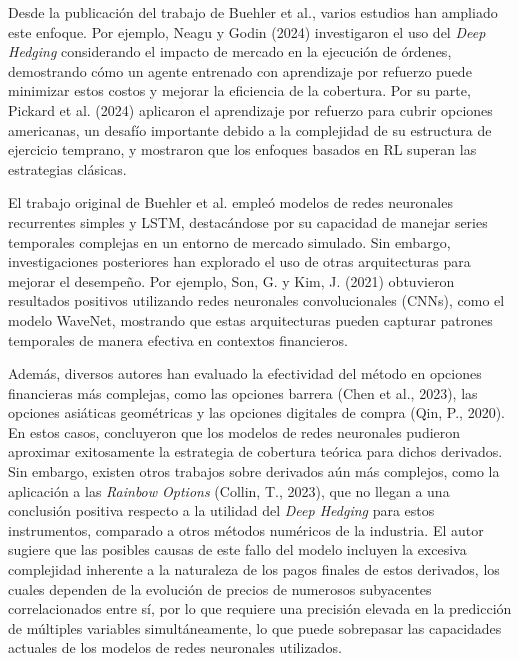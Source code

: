 \documentclass[11pt,a4paper,spanish]{article}
\numberwithin{equation}{section} %
\begin{document}
Desde la publicación del trabajo de Buehler et al., varios estudios han ampliado este enfoque. Por ejemplo, Neagu y Godin (2024) investigaron el uso del \textit{Deep Hedging} considerando el impacto de mercado en la ejecución de órdenes, demostrando cómo un agente entrenado con aprendizaje por refuerzo puede minimizar estos costos y mejorar la eficiencia de la cobertura. Por su parte, Pickard et al. (2024) aplicaron el aprendizaje por refuerzo para cubrir opciones americanas, un desafío importante debido a la complejidad de su estructura de ejercicio temprano, y mostraron que los enfoques basados en RL superan las estrategias clásicas.

El trabajo original de Buehler et al. empleó modelos de redes neuronales recurrentes simples y LSTM, destacándose por su capacidad de manejar series temporales complejas en un entorno de mercado simulado. Sin embargo, investigaciones posteriores han explorado el uso de otras arquitecturas para mejorar el desempeño. Por ejemplo, Son, G. y Kim, J. (2021) obtuvieron resultados positivos utilizando redes neuronales convolucionales (CNNs), como el modelo WaveNet, mostrando que estas arquitecturas pueden capturar patrones temporales de manera efectiva en contextos financieros.

Además, diversos autores han evaluado la efectividad del método en opciones financieras más complejas, como las opciones barrera (Chen et al., 2023), las opciones asiáticas geométricas y las opciones digitales de compra (Qin, P., 2020). En estos casos, concluyeron que los modelos de redes neuronales pudieron aproximar exitosamente la estrategia de cobertura teórica para dichos derivados. Sin embargo, existen otros trabajos sobre derivados aún más complejos, como la aplicación a las \textit{Rainbow Options} (Collin, T., 2023), que no llegan a una conclusión positiva respecto a la utilidad del \textit{Deep Hedging} para estos instrumentos, comparado a otros métodos numéricos de la industria. El autor sugiere que las posibles causas de este fallo del modelo incluyen la excesiva complejidad inherente a la naturaleza de los pagos finales de estos derivados, los cuales dependen de la evolución de precios de numerosos subyacentes correlacionados entre sí, por lo que requiere una precisión elevada en la predicción de múltiples variables simultáneamente, lo que puede sobrepasar las capacidades actuales de los modelos de redes neuronales utilizados.
\end{document}
